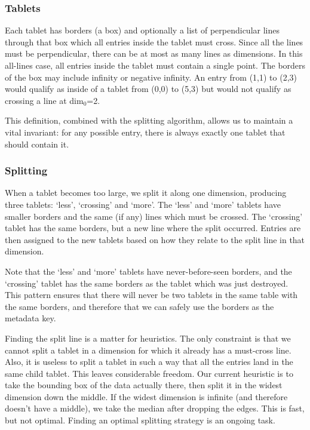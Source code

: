 \documentclass[11pt]{article}
\begin{document}
\subsubsection{Tablets}

Each tablet has borders (a box) and optionally a list of perpendicular lines through that box which all entries inside the tablet must cross. Since all the lines must be perpendicular, there can be at most as many lines as dimensions. In this all-lines case, all entries inside the tablet must contain a single point. The borders of the box may include infinity or negative infinity. An entry from (1,1) to (2,3) would qualify as inside of a tablet from (0,0) to (5,3) but would not qualify as crossing a line at dim$_0$=2.

This definition, combined with the splitting algorithm, allows us to maintain a vital invariant: for any possible entry, there is always exactly one tablet that should contain it.

\subsubsection{Splitting}

When a tablet becomes too large, we split it along one dimension, producing three tablets: `less', `crossing' and `more'. The `less' and `more' tablets have smaller borders and the same (if any) lines which must be crossed. The `crossing' tablet has the same borders, but a new line where the split occurred. Entries are then assigned to the new tablets based on how they relate to the split line in that dimension.

Note that the `less' and `more' tablets have never-before-seen borders, and the `crossing' tablet has the same borders as the tablet which was just destroyed. This pattern ensures that there will never be two tablets in the same table with the same borders, and therefore that we can safely use the borders as the metadata key.

Finding the split line is a matter for heuristics. The only constraint is that we cannot split a tablet in a dimension for which it already has a must-cross line. Also, it is useless to split a tablet in such a way that all the entries land in the same child tablet. This leaves considerable freedom. Our current heuristic is to take the bounding box of the data actually there, then split it in the widest dimension down the middle. If the widest dimension is infinite (and therefore doesn't have a middle), we take the median after dropping the edges. This is fast, but not optimal. Finding an optimal splitting strategy is an ongoing task.
\end{document}
